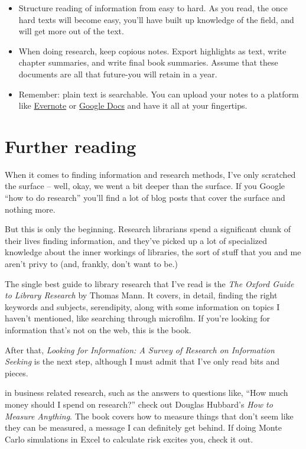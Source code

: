 \begin{itemize}
\item Structure reading of information from easy to hard. As you read, the once hard
texts will become easy, you'll have built up knowledge of the field, and will
get more out of the text.

\item When doing research, keep copious notes. Export highlights as text, write
chapter summaries, and write final book summaries. Assume that these documents
are all that future-you will retain in a year.

\item Remember: plain text is searchable. You can upload your notes to a platform
like \href{http://evernote.com/}{Evernote} or \href{http://docs.google.com}{Google Docs} and have it all at your fingertips.
\end{itemize}

\section{Further reading}

When it comes to finding information and research methods, I've only scratched
the surface -- well, okay, we went a bit deeper than the surface. If you
Google ``how to do research'' you'll find a lot of blog posts that cover the
surface and nothing more.

But this is only the beginning. Research librarians spend a significant chunk of their
lives finding information, and they've picked up a lot of specialized
knowledge about the inner workings of libraries, the sort of stuff that you and
me aren't privy to (and, frankly, don't want to be.)

The single best guide to library research that I've read is the \textit{The
  Oxford Guide to Library Research} by Thomas Mann. It covers, in detail,
finding the right keywords and subjects, serendipity, along with some
information on topics I haven't mentioned, like searching through
microfilm. If you're looking for information that's not on the web, this is the
book.

After that, \textit{Looking for Information: A Survey of Research on Information
  Seeking} is the next step, although I must admit that I've only read bits and
pieces.

 in business related research, such as the
answers to questions like, ``How much money should I spend on research?'' check
out Douglas Hubbard's \textit{How to Measure Anything}. The book covers how to
measure things that don't seem like they can be measured, a message I can
definitely get behind. If doing Monte Carlo simulations in Excel to calculate
risk excites you, check it out.

